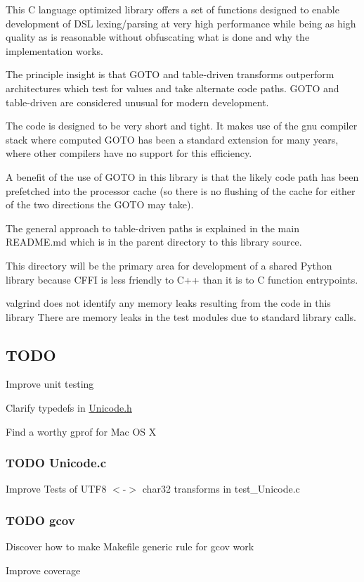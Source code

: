 This C language optimized library offers a set of functions designed to enable development of D\+S\+L lexing/parsing at very high performance while being as high quality as is reasonable without obfuscating what is done and why the implementation works.

The principle insight is that G\+O\+T\+O and table-\/driven transforms outperform architectures which test for values and take alternate code paths. G\+O\+T\+O and table-\/driven are considered unusual for modern development.

The code is designed to be very short and tight. It makes use of the gnu compiler stack where computed G\+O\+T\+O has been a standard extension for many years, where other compilers have no support for this efficiency.

A benefit of the use of G\+O\+T\+O in this library is that the likely code path has been prefetched into the processor cache (so there is no flushing of the cache for either of the two directions the G\+O\+T\+O may take).

The general approach to table-\/driven paths is explained in the main R\+E\+A\+D\+M\+E.\+md which is in the parent directory to this library source.

This directory will be the primary area for development of a shared Python library because C\+F\+F\+I is less friendly to C++ than it is to C function entrypoints.

valgrind does not identify any memory leaks resulting from the code in this library There are memory leaks in the test modules due to standard library calls.

\subsection*{T\+O\+D\+O}


\begin{DoxyItemize}
\item Improve unit testing
\item Clarify typedefs in \hyperlink{_unicode_8h_source}{Unicode.\+h}
\item Find a worthy gprof for Mac O\+S X
\end{DoxyItemize}

\subsubsection*{T\+O\+D\+O Unicode.\+c}


\begin{DoxyItemize}
\item Improve Tests of U\+T\+F8 $<$-\/$>$ char32 transforms in test\+\_\+\+Unicode.\+c
\end{DoxyItemize}

\subsubsection*{T\+O\+D\+O gcov}


\begin{DoxyItemize}
\item Discover how to make Makefile generic rule for gcov work
\item Improve coverage 
\end{DoxyItemize}